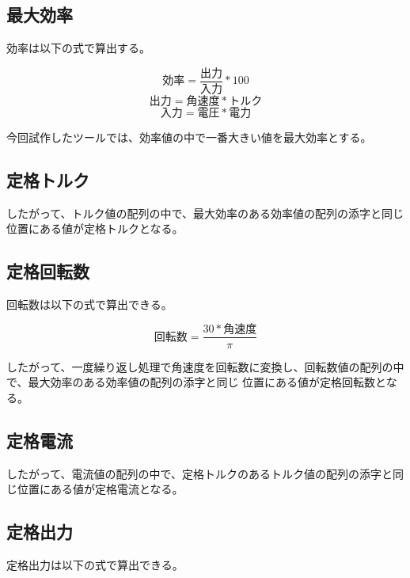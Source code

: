 
\subsection{最大効率}\label{sub:keisan_saidaikouritu}
効率は以下の式で算出する。

\[
    \mbox{効率} = \frac{\mbox{出力}}{\mbox{入力}}  * 100 
\]
\[
    \mbox{出力} = \mbox{角速度} * \mbox{トルク} 
\]
\[  
    \mbox{入力} = \mbox{電圧} * \mbox{電力} 
\]

今回試作したツールでは、効率値の中で一番大きい値を最大効率とする。



\subsection{定格トルク}\label{sub:keisan_teikakutoruku}
したがって、トルク値の配列の中で、最大効率のある効率値の配列の添字と同じ位置にある値が定格トルクとなる。



\subsection{定格回転数}\label{sub:keisan_teikakukaiten}
回転数は以下の式で算出できる。

\[
    \mbox{回転数} = \frac{30 * \mbox{角速度}}{\pi}   
\]

したがって、一度繰り返し処理で角速度を回転数に変換し、回転数値の配列の中で、最大効率のある効率値の配列の添字と同じ
位置にある値が定格回転数となる。


\subsection{定格電流}\label{sub:keisan_teikakuden}
したがって、電流値の配列の中で、定格トルクのあるトルク値の配列の添字と同じ位置にある値が定格電流となる。


\subsection{定格出力}\label{sub:keisan_teikakusyutu}
定格出力は以下の式で算出できる。

